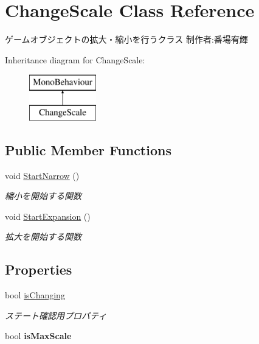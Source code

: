 \hypertarget{class_change_scale}{}\section{Change\+Scale Class Reference}
\label{class_change_scale}


ゲームオブジェクトの拡大・縮小を行うクラス 制作者\+:番場宥輝  


Inheritance diagram for Change\+Scale\+:\begin{figure}[H]
\begin{center}
\leavevmode
\includegraphics[height=2.000000cm]{class_change_scale}
\end{center}
\end{figure}
\subsection*{Public Member Functions}
\begin{DoxyCompactItemize}
\item 
void \hyperlink{class_change_scale_a4a306bcc12f9855028d8141966af3c09}{Start\+Narrow} ()
\begin{DoxyCompactList}\small\item\em 縮小を開始する関数 \end{DoxyCompactList}\item 
void \hyperlink{class_change_scale_ade4b9eab7494442dc56e92f96a6a3c2b}{Start\+Expansion} ()
\begin{DoxyCompactList}\small\item\em 拡大を開始する関数 \end{DoxyCompactList}\end{DoxyCompactItemize}
\subsection*{Properties}
\begin{DoxyCompactItemize}
\item 
bool \hyperlink{class_change_scale_aaef648ca57bd63b7815e280a0cf58341}{is\+Changing}
\begin{DoxyCompactList}\small\item\em ステート確認用プロパティ \end{DoxyCompactList}\item 
\mbox{\label{class_change_scale_ae9b937ada20d587fa0dc08efdc1025cc}} 
bool {\bfseries is\+Max\+Scale}
\end{DoxyCompactItemize}
